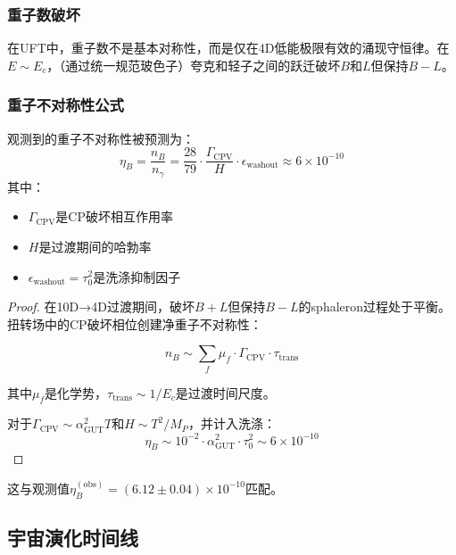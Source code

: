 \subsubsection{重子数破坏}

在UFT中，重子数不是基本对称性，而是仅在4D低能极限有效的涌现守恒律。在$E \sim E_c$，（通过统一规范玻色子）夸克和轻子之间的跃迁破坏$B$和$L$但保持$B-L$。

\subsubsection{重子不对称性公式}

\begin{theorem}[重子-光子比]
观测到的重子不对称性被预测为：
\begin{equation}
    \eta_B = \frac{n_B}{n_\gamma} = \frac{28}{79} \cdot \frac{\Gamma_{\text{CPV}}}{H} \cdot \epsilon_{\text{washout}} \approx 6 \times 10^{-10}
\end{equation}
其中：
\begin{itemize}
    \item $\Gamma_{\text{CPV}}$是CP破坏相互作用率
    \item $H$是过渡期间的哈勃率
    \item $\epsilon_{\text{washout}} = \tau_0^2$是洗涤抑制因子
\end{itemize}
\end{theorem}

\begin{proof}
在10D→4D过渡期间，破坏$B+L$但保持$B-L$的sphaleron过程处于平衡。扭转场中的CP破坏相位创建净重子不对称性：

\begin{equation}
    n_B \sim \sum_f \mu_f \cdot \Gamma_{\text{CPV}} \cdot \tau_{\text{trans}}
\end{equation}

其中$\mu_f$是化学势，$\tau_{\text{trans}} \sim 1/E_c$是过渡时间尺度。

对于$\Gamma_{\text{CPV}} \sim \alpha_{\text{GUT}}^2 T$和$H \sim T^2/M_P$，并计入洗涤：
\begin{equation}
    \eta_B \sim 10^{-2} \cdot \alpha_{\text{GUT}}^2 \cdot \tau_0^2 \sim 6 \times 10^{-10}
\end{equation}
\end{proof}

这与观测值$\eta_B^{(\text{obs})} = (6.12 \pm 0.04) \times 10^{-10}$匹配。

\subsection{宇宙演化时间线}

